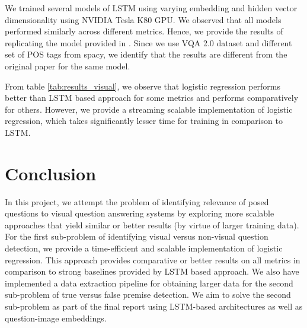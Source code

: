 We trained several models of LSTM using varying embedding and hidden vector dimensionality using NVIDIA Tesla K80 GPU. We observed that all models performed similarly across different metrics. Hence, we provide the results of replicating the model provided in \cite{ray2016question}. Since we use VQA 2.0 dataset \cite{goyal2016making} and different set of POS tags from spacy, we identify that the results are different from the original paper for the same model.

From table \ref{tab:results_visual}, we observe that logistic regression performs better than LSTM based approach for some metrics and performs comparatively for others. However, we provide a streaming scalable implementation of logistic regression, which takes significantly lesser time for training in comparison to LSTM.

\section{Conclusion}

In this project, we attempt the problem of identifying relevance of posed questions to visual question answering systems by exploring more scalable approaches that yield similar or better results (by virtue of larger training data). For the first sub-problem of identifying visual versus non-visual question detection, we provide a time-efficient and scalable implementation of logistic regression. This approach provides comparative or better results on all metrics in comparison to strong baselines provided by LSTM based approach. We also have implemented a data extraction pipeline for obtaining larger data for the second sub-problem of true versus false premise detection. We aim to solve the second sub-problem as part of the final report using LSTM-based architectures as well as question-image embeddings.
